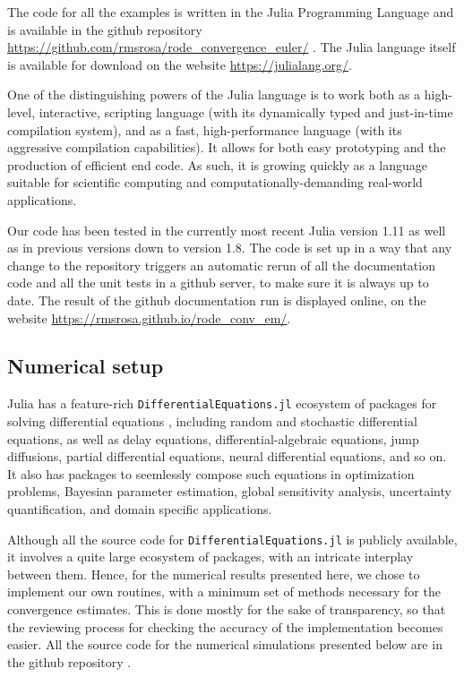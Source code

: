 \documentclass[reqno,12pt]{amsart}
\theoremstyle{plain} %
\theoremstyle{definition} %
\begin{document}
The code for all the examples is written in the Julia Programming Language \cite{Julia2017} and is available in the github repository \url{https://github.com/rmsrosa/rode_convergence_euler/} \cite{RODEConvEM2023}. The Julia language itself is available for download on the website \url{https://julialang.org/}.

One of the distinguishing powers of the Julia language is to work both as a high-level, interactive, scripting language (with its dynamically typed and just-in-time compilation system), and as a fast, high-performance language (with its aggressive compilation capabilities). It allows for both easy prototyping and the production of efficient end code. As such, it is growing quickly as a language suitable for scientific computing and computationally-demanding real-world applications.

Our code has been tested in the currently most recent Julia version 1.11 as well as in previous versions down to version 1.8. The code is set up in a way that any change to the repository triggers an automatic rerun of all the documentation code and all the unit tests in a github server, to make sure it is always up to date. The result of the github documentation run is displayed online, on the website \url{https://rmsrosa.github.io/rode_conv_em/}.

\subsection{Numerical setup}
\label{secnumericalsetup}

Julia has a feature-rich \texttt{DifferentialEquations.jl} ecosystem of packages for solving differential equations \cite{DifferentialEquations.jl-2017}, including random and stochastic differential equations, as well as delay equations, differential-algebraic equations, jump diffusions, partial differential equations, neural differential equations, and so on. It also has packages to seemlessly compose such equations in optimization problems, Bayesian parameter estimation, global sensitivity analysis, uncertainty quantification, and domain specific applications.

Although all the source code for \texttt{DifferentialEquations.jl} is publicly available, it involves a quite large ecosystem of packages, with an intricate interplay between them. Hence, for the numerical results presented here, we chose to implement our own routines, with a minimum set of methods necessary for the convergence estimates. This is done mostly for the sake of transparency, so that the reviewing process for checking the accuracy of the implementation becomes easier. All the source code for the numerical simulations presented below are in the github repository \cite{RODEConvEM2023}.
\end{document}
